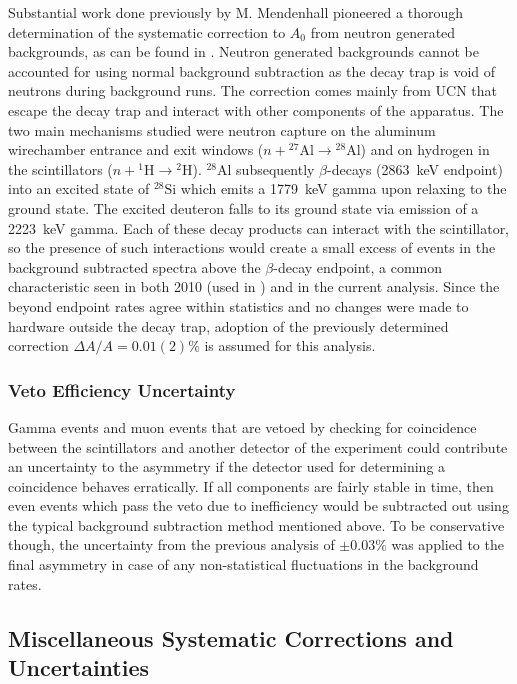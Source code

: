 Substantial work done previously by M. Mendenhall pioneered a thorough determination
of the systematic correction to $A_0$ from neutron generated backgrounds, as can be
found in \cite{mpmThesis}. Neutron generated backgrounds cannot be accounted for
using normal background subtraction as the decay trap is void of neutrons during background
runs. The correction comes mainly from UCN that escape the decay trap
and interact with other components of the apparatus. The two main mechanisms studied
were neutron capture on the aluminum wirechamber entrance and exit windows
($n+ {^{27}\mathrm{Al}} \rightarrow {^{28}\mathrm{Al}}$) and on hydrogen in
the scintillators ($n+{^{1}\mathrm{H}} \rightarrow {^{2}\mathrm{H}}$). ${^{28}\mathrm{Al}}$
subsequently $\beta$-decays (2863~keV endpoint) into an excited state of ${^{28}\mathrm{Si}}$
which emits a 1779~keV gamma upon relaxing to the ground state. The excited deuteron falls
to its ground state via emission of a 2223~keV gamma. Each of these decay products can
interact with the scintillator, so the presence of such interactions would create a small
excess of events in the
background subtracted spectra
above the $\beta$-decay endpoint, a common characteristic seen in both 2010 (used in
\cite{mpmThesis}) and in the current analysis. Since the
beyond endpoint rates agree within statistics and no changes were made to hardware outside
the decay trap, adoption of
the previously determined correction $\Delta A /A = 0.01(2)\%$ is assumed for this analysis.

\subsubsection{Veto Efficiency Uncertainty}

Gamma events and muon events that are vetoed by checking for coincidence between the scintillators and
another detector of the experiment could contribute an uncertainty to the asymmetry if the detector
used for determining a coincidence behaves erratically. If all components are fairly stable in time,
then even events which pass the veto due to inefficiency would be subtracted out using the
typical background subtraction method mentioned above. To be conservative though, the uncertainty
from the previous analysis of $\pm 0.03\%$ was applied to the final asymmetry in case of
any non-statistical fluctuations in the background rates.


\subsection{Miscellaneous Systematic Corrections and Uncertainties}

